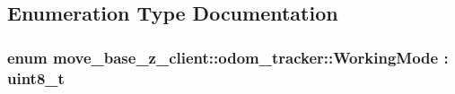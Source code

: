 \subsection{Enumeration Type Documentation}
\subsubsection[{\texorpdfstring{Working\+Mode}{WorkingMode}}]{\setlength{\rightskip}{0pt plus 5cm}enum {\bf move\+\_\+base\+\_\+z\+\_\+client\+::odom\+\_\+tracker\+::\+Working\+Mode} \+: uint8\+\_\+t\hspace{0.3cm}{\ttfamily [strong]}}\hypertarget{namespacemove__base__z__client_1_1odom__tracker_adf3e5fc3644563922cc64a20a0197224}{}\label{namespacemove__base__z__client_1_1odom__tracker_adf3e5fc3644563922cc64a20a0197224}
